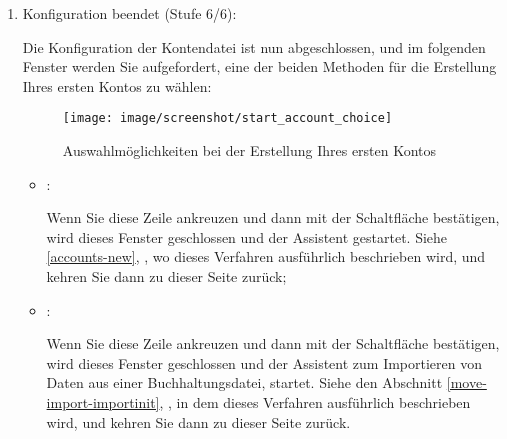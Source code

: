 \begin{enumerate}
	\item Konfiguration beendet (Stufe 6/6):\par%
	Die Konfiguration der Kontendatei ist nun abgeschlossen, und im folgenden Fenster werden Sie aufgefordert, eine der beiden Methoden für die Erstellung Ihres ersten Kontos zu wählen:%

\vspace{2mm}

\begin{figure}[htbp]
	\begin{center}
		\texttt{[image: image/screenshot/start\_account\_choice]}
	\end{center}
	\caption{Auswahlmöglichkeiten bei der Erstellung Ihres ersten Kontos}
	\label{start_account_choice}
\end{figure}

	\begin{itemize}
		\item[\textopenbullet] :\par%
		Wenn Sie diese Zeile ankreuzen und dann mit der Schaltfläche  bestätigen, wird dieses Fenster geschlossen und der Assistent  gestartet. Siehe \vref{accounts-new}, , wo dieses Verfahren ausführlich beschrieben wird, und kehren Sie dann zu dieser Seite zurück;%
	
		\item[\textopenbullet] :\par%
		Wenn Sie diese Zeile ankreuzen und dann mit der Schaltfläche  bestätigen, wird dieses Fenster geschlossen und der  Assistent zum Importieren von Daten aus einer Buchhaltungsdatei, startet. Siehe den Abschnitt \vref{move-import-importinit}, , in dem dieses Verfahren ausführlich beschrieben wird, und kehren Sie dann zu dieser Seite zurück.%
	\end{itemize}


\end{enumerate}

